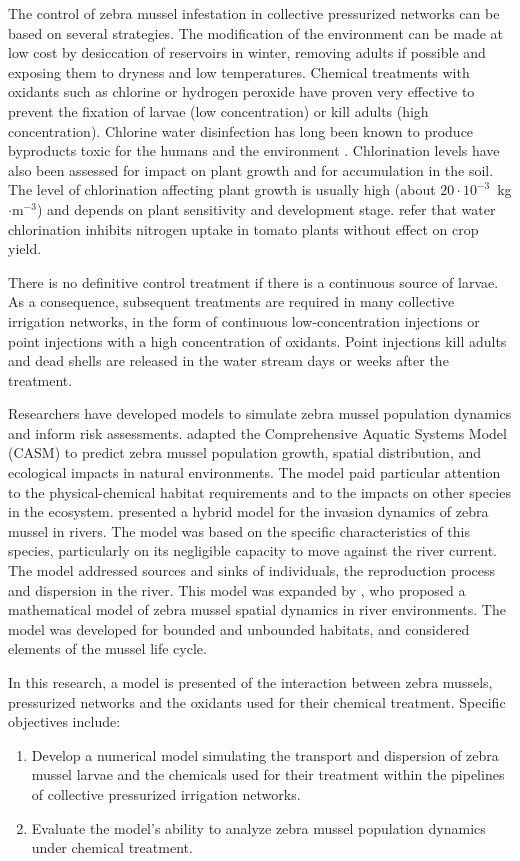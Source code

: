 \documentclass[review,authoryear]{elsarticle}
\begin{document}
The control of zebra mussel infestation in collective pressurized networks can
be based on several strategies. The modification of the environment can be made
at low cost by desiccation of reservoirs in winter, removing adults if possible
and exposing them to dryness and low temperatures. Chemical treatments with
oxidants such as chlorine or hydrogen peroxide have proven very effective to
prevent the fixation of larvae (low concentration) or kill adults (high
concentration). Chlorine water disinfection has long been known to produce
byproducts toxic for the humans and the environment \citep{Hanigan17}.
Chlorination levels have also been assessed for
impact on plant growth and for accumulation in the soil. The level of
chlorination affecting plant growth is usually high (about
$20\cdot10^{-3}$~kg$\cdot$m$^{-3}$) and depends on plant sensitivity and
development stage. \citet{LiLi09} refer that water chlorination inhibits
nitrogen uptake in tomato plants without effect on crop yield.

There is no definitive control treatment if there is a continuous source of
larvae. As a consequence, subsequent treatments are required in many collective
irrigation networks, in the form of continuous low-concentration injections or
point injections with a high concentration of oxidants. Point injections kill
adults and dead shells are released in the water stream days or weeks after the
treatment.

Researchers have developed models to simulate zebra mussel population dynamics
and inform risk assessments. \citet{Wu10} adapted the Comprehensive Aquatic
Systems Model (CASM) to predict zebra mussel population growth, spatial
distribution, and ecological impacts in natural environments. The model paid
particular attention to the physical-chemical habitat requirements and to the
impacts on other species in the ecosystem. \citet{Huang17} presented a hybrid
model for the invasion dynamics of zebra mussel in rivers. The model was based
on the specific characteristics of this species, particularly on its negligible
capacity to move against the river current. The model addressed sources and
sinks of individuals, the reproduction process and dispersion in the river. This
model was expanded by \citet{JinZhao21}, who proposed a mathematical model of
zebra mussel spatial dynamics in river environments. The model was developed for
bounded and unbounded habitats, and considered elements of the mussel life
cycle.

In this research, a model is presented of the interaction between zebra mussels,
pressurized networks and the oxidants used for their chemical treatment.
Specific objectives include:
\begin{enumerate}
	\item Develop a numerical model simulating the transport and dispersion
		of zebra mussel larvae and the chemicals used for their
		treatment within the pipelines of collective pressurized
		irrigation networks.
	\item Evaluate the model's ability to analyze zebra mussel population
		dynamics under chemical treatment.
\end{enumerate}
\end{document}

